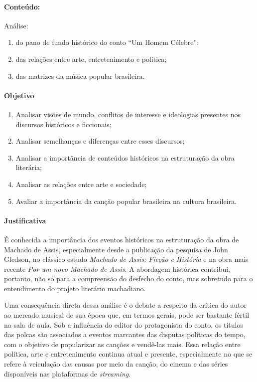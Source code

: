 \documentclass[11pt]{extarticle}
\begin{document}
\paragraph{Conteúdo:} Análise:
\begin{enumerate}
\item
do pano de fundo histórico do conto ``Um Homem Célebre''; 
\item
das relações entre arte, entretenimento e política; 
\item
das matrizes da música popular brasileira.
\end{enumerate}

\paragraph{Objetivo}
\begin{enumerate}
\item
Analisar visões de mundo, conflitos de interesse e
ideologias presentes nos discursos históricos e ficcionais; 
\item
Analisar
semelhanças e diferenças entre esses discursos; 
\item
Analisar a importância de conteúdos históricos na estruturação da obra literária;
\item
Analisar as relações entre arte e sociedade; 
\item
Avaliar a importância da canção popular brasileira na cultura brasileira.
\end{enumerate}

\paragraph{Justificativa} É conhecida a importância dos eventos históricos
na estruturação da obra de Machado de Assis, especialmente desde a
publicação da pesquisa de John Gledson, no clássico estudo \emph{Machado
de Assis: Ficção e História} e na obra mais recente \emph{Por um novo
Machado de Assis}. A abordagem histórica contribui, portanto, não só
para a compreensão do desfecho do conto, mas sobretudo para o
entendimento do projeto literário machadiano.


Uma consequência direta dessa análise é o debate a respeito da crítica
do autor ao mercado musical de sua época que, em termos gerais, pode ser
bastante fértil na sala de aula. Sob a influência do editor do
protagonista do conto, os títulos das polcas são associados a eventos
marcantes das disputas políticas do tempo, com o objetivo de popularizar
as canções e vendê-las mais. Essa relação entre política, arte e
entretenimento continua atual e presente, especialmente no que se refere
à veiculação das causas por meio da canção, do cinema e das séries
disponíveis nas plataformas de \emph{streaming}.
\end{document}
